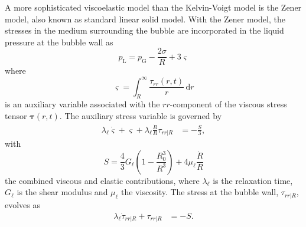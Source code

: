 A more sophisticated viscoelastic model than the Kelvin-Voigt model is the Zener model, also known as standard linear solid model. With the Zener model, the stresses in the medium surrounding the bubble are incorporated in the liquid pressure at the bubble wall as \citep{Hua2013}
\begin{equation}
     p_\text{L} = p_\text{G} - \frac{2 \sigma}{R} + 3 \varsigma \label{eq:pL_Zener}
\end{equation}
where
\begin{equation}
    \varsigma= \int_R^\infty \frac{\tau_{rr}(r,t)}{r} \, \mathrm{d}r
\end{equation}
is an auxiliary variable associated with the $rr$-component of the viscous stress tensor $\boldsymbol{\tau}(r,t)$. The auxiliary stress variable is governed by
\begin{align}
    \lambda_\ell \dot{\varsigma} + \varsigma +\lambda_\ell \frac{\dot{R}}{R} {\tau}_{rr|R} &= - \frac{S}{3},  \label{eq:ode_varsigma}
\end{align}
with
\begin{equation}
    S = \frac{4}{3} G_\ell \left( 1- \frac{R_0^3}{R^3} \right) + 4 \mu_\ell \frac{\dot{R}}{R}
\end{equation}
the combined viscous and elastic contributions, where $\lambda_\ell$ is the relaxation time, $G_\ell$ is the shear modulus and $\mu_\ell$ the viscosity. The stress at the bubble wall, ${\tau}_{rr|R}$, evolves as
\begin{align}
    \lambda_\ell \dot{\tau}_{rr|R} + {\tau}_{rr|R} &= -S. \label{eq:ode_tau}
\end{align}

